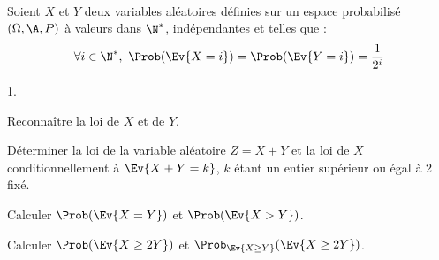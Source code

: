 \documentclass[11pt]{article}%
\begin{document}

\begin{exerciceSP}~\\
  Soient $X$ et $Y$ deux variables aléatoires définies sur un espace
  probabilisé $(\Omega , \A , P)$ à valeurs dans $\N^*$,
  indépendantes et telles que :
  \[
  \forall i \in \N^*, \ \Prob(\Ev{X=i}) = \Prob(\Ev{Y=i}) =
  \dfrac{1}{2^i}
  \] 
  \begin{noliste}{1.}
    \setlength{\itemsep}{2mm}
  \item Reconnaître la loi de $X$ et de $Y$.
  \item Déterminer la loi de la variable aléatoire $Z = X+Y$ et la loi
    de $X$ conditionnellement à $\Ev{X + Y = k}$, $k$ étant un entier
    supérieur ou égal à 2 fixé.
  \item Calculer $\Prob(\Ev{X = Y})$ et $\Prob(\Ev{X > Y})$.
  \item Calculer $\Prob(\Ev{X \geq 2 Y})$ et $\Prob_{\Ev{X \geq Y}}
    (\Ev{X \geq 2 Y})$.
  \end{noliste}
\end{exerciceSP}





\end{document}
